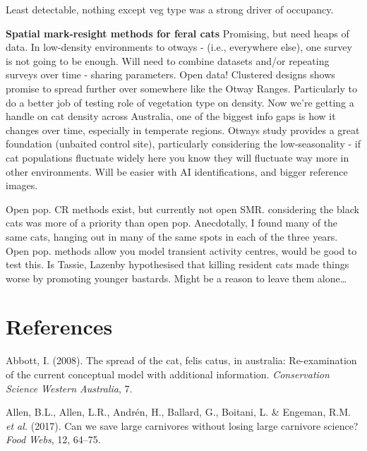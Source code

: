 \documentclass[11pt,a4paper,titlepage,twoside,openright]{style/unimelbthesis}
\begin{document}
\begin{mainmatter}
Least detectable, nothing except veg type was a strong driver of occupancy.

\textbf{Spatial mark-resight methods for feral cats}
Promising, but need heaps of data.
In low-density environments to otways - (i.e., everywhere else), one survey is not going to be enough. Will need to combine datasets and/or repeating surveys over time - sharing parameters. Open data!
Clustered designs shows promise to spread further over somewhere like the Otway Ranges. Particularly to do a better job of testing role of vegetation type on density.
Now we're getting a handle on cat density across Australia, one of the biggest info gaps is how it changes over time, especially in temperate regions. Otways study provides a great foundation (unbaited control site), particularly considering the low-seasonality - if cat populations fluctuate widely here you know they will fluctuate way more in other environments. Will be easier with AI identifications, and bigger reference images.

Open pop. CR methods exist, but currently not open SMR. considering the black cats was more of a priority than open pop. Anecdotally, I found many of the same cats, hanging out in many of the same spots in each of the three years. Open pop. methods allow you model transient activity centres, would be good to test this.
Is Tassie, Lazenby hypothesised that killing resident cats made things worse by promoting younger bastards. Might be a reason to leave them alone\ldots{}

\hypertarget{references}{%
\chapter*{References}\label{references}}


\noindent

\setlength{\parindent}{-0.20in}
\setlength{\leftskip}{0.20in}

\hypertarget{refs}{}
\leavevmode\hypertarget{ref-abbott2008spread}{}%
Abbott, I. (2008). The spread of the cat, felis catus, in australia: Re-examination of the current conceptual model with additional information. \emph{Conservation Science Western Australia}, 7.

\leavevmode\hypertarget{ref-allen2017can}{}%
Allen, B.L., Allen, L.R., Andrén, H., Ballard, G., Boitani, L. \& Engeman, R.M. \emph{et al.} (2017). Can we save large carnivores without losing large carnivore science? \emph{Food Webs}, 12, 64--75.


\end{mainmatter}
\end{document}
